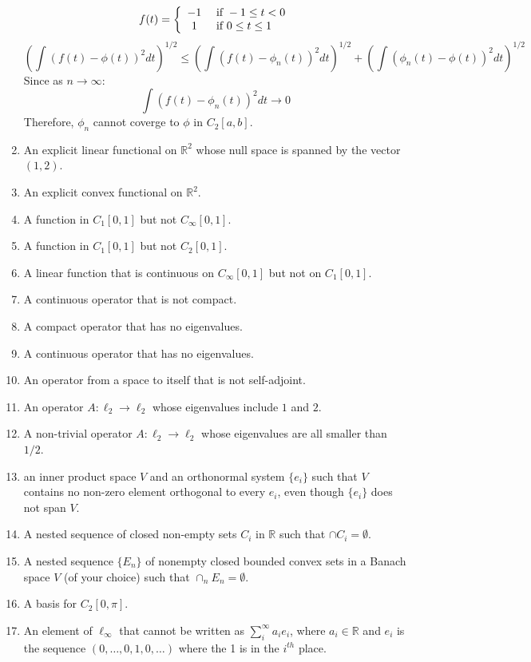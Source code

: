 \documentclass[12pt,letterpaper,reqno]{amsart}
\newcommand{\R}{\mathbb R}
\begin{document}
\begin{enumerate}[1.]
\begin{flushleft}
    $$f ( t ) = \left\{ \begin{array} { c l } { - 1 } & { \text { if } - 1 \leq t < 0 } \\ { 1 } & { \text { if } 0 \leq t \leq 1 } \end{array} \right.$$
    $$\left( \int ( f ( t ) - \phi ( t ) ) ^ { 2 } d t \right) ^ { 1 / 2 } \leq \left( \int \left( f ( t ) - \phi _ { n } ( t ) \right) ^ { 2 } d t \right) ^ { 1 / 2 } + \left( \int \left( \phi _ { n } ( t ) - \phi ( t ) \right) ^ { 2 } d t \right) ^ { 1 / 2 }$$
    Since as $n \rightarrow \infty$:
    $$\int \left( f ( t ) - \phi _ { n } ( t ) \right) ^ { 2 } d t \rightarrow 0$$
    Therefore, $\phi_n$ cannot coverge to $\phi$ in $C_2[a,b]$. 
\end{flushleft}
\item An explicit linear functional on $\R^2$ whose null space is spanned by the vector $(1,2)$.
\item An explicit convex functional on $\R^2$.
\item A function in $C_1[0,1]$ but not $C_\infty[0,1]$. 
\item A function in $C_1[0,1]$ but not $C_2[0,1]$.
\item A linear function that is continuous on $C_\infty[0,1]$ but not on $C_1[0,1]$.
\item A continuous operator that is not compact.
\item A compact operator that has no eigenvalues.
\item A continuous operator that has no eigenvalues.
\item An operator from a space to itself that is not self-adjoint.
\item An operator $A:\ell_2\rightarrow \ell_2$ whose eigenvalues include $1$ and $2$.
\item A non-trivial operator $A:\ell_2\rightarrow \ell_2$ whose eigenvalues are all smaller than $1/2$.
\item an inner product space $V$ and an orthonormal system $\{e_i\}$ such that $V$ contains no non-zero element orthogonal to every $e_i$, even though $\{e_i\}$ does not span $V$.
\item A nested sequence of closed non-empty sets $C_i$ in $\R$ such that $\cap C_i=\emptyset$.
\item A nested sequence $\{E_n\}$ of nonempty closed bounded convex sets in a Banach space $V$ (of your choice) such that $\cap_n E_n=\emptyset$.
\item A basis for $C_2[0,\pi]$.
\item An element of $\ell_\infty$ that cannot be written as $\sum_i^\infty a_i e_i$, where $a_i\in \R$ and $e_i$ is the sequence $(0,\ldots, 0, 1, 0, \ldots)$ where the 1 is in the $i^{th}$ place.

\end{enumerate}
\end{document}
